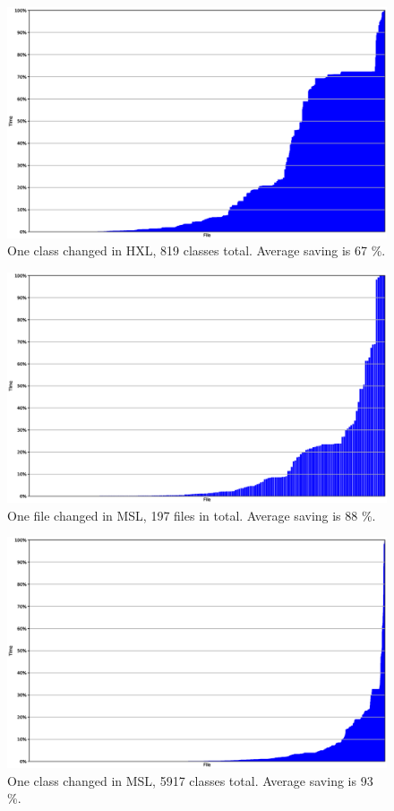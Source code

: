 \documentclass{cslthse-msc}
\begin{document}
\begin{figure}[!htbp]
    \centering
    \includegraphics[width=\textwidth]{Graphs/HXL_one_model.eps}
    \caption{One class changed in HXL, 819 classes total. Average saving is 67 \%.}
    \label{fig:hxlonemodel}
\end{figure}

\begin{figure}[!htbp]
    \centering
    \includegraphics[width=\textwidth]{Graphs/MSL_one_file.eps}
    \caption{One file changed in MSL, 197 files in total. Average saving is 88 \%.}
    \label{fig:mslonefile}
\end{figure}

\begin{figure}[!htbp]
    \centering
    \includegraphics[width=\textwidth]{Graphs/MSL_one_model.eps}
    \caption{One class changed in MSL, 5917 classes total. Average saving is 93 \%. }
    \label{fig:mslonemodel}
\end{figure}
\end{document}

